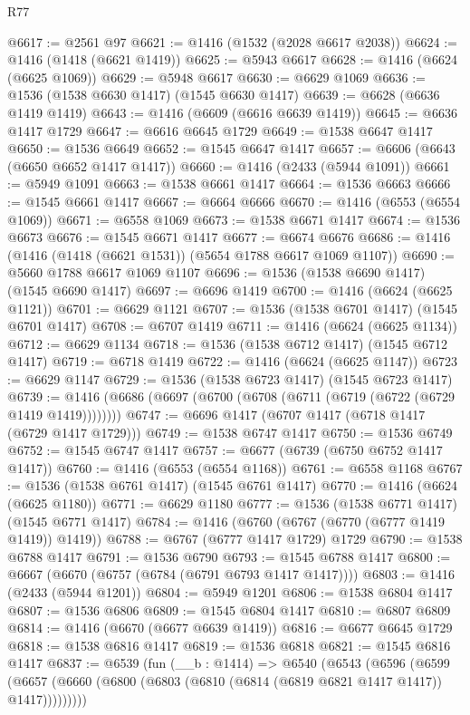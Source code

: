 \begin{lexlean}{R77}
\begin{coremodule}
{{@6617 := @2561 @97
@6621 := @1416 (@1532 (@2028 @6617 @2038))
@6624 := @1416 (@1418 (@6621 @1419))
@6625 := @5943 @6617
@6628 := @1416 (@6624 (@6625 @1069))
@6629 := @5948 @6617
@6630 := @6629 @1069
@6636 := @1536 (@1538 @6630 @1417) (@1545 @6630 @1417)
@6639 := @6628 (@6636 @1419 @1419)
@6643 := @1416 (@6609 (@6616 @6639 @1419))
@6645 := @6636 @1417 @1729
@6647 := @6616 @6645 @1729
@6649 := @1538 @6647 @1417
@6650 := @1536 @6649
@6652 := @1545 @6647 @1417
@6657 := @6606 (@6643 (@6650 @6652 @1417 @1417))
@6660 := @1416 (@2433 (@5944 @1091))
@6661 := @5949 @1091
@6663 := @1538 @6661 @1417
@6664 := @1536 @6663
@6666 := @1545 @6661 @1417
@6667 := @6664 @6666
@6670 := @1416 (@6553 (@6554 @1069))
@6671 := @6558 @1069
@6673 := @1538 @6671 @1417
@6674 := @1536 @6673
@6676 := @1545 @6671 @1417
@6677 := @6674 @6676
@6686 := @1416 (@1416 (@1418 (@6621 @1531)) (@5654 @1788 @6617 @1069 @1107))
@6690 := @5660 @1788 @6617 @1069 @1107
@6696 := @1536 (@1538 @6690 @1417) (@1545 @6690 @1417)
@6697 := @6696 @1419
@6700 := @1416 (@6624 (@6625 @1121))
@6701 := @6629 @1121
@6707 := @1536 (@1538 @6701 @1417) (@1545 @6701 @1417)
@6708 := @6707 @1419
@6711 := @1416 (@6624 (@6625 @1134))
@6712 := @6629 @1134
@6718 := @1536 (@1538 @6712 @1417) (@1545 @6712 @1417)
@6719 := @6718 @1419
@6722 := @1416 (@6624 (@6625 @1147))
@6723 := @6629 @1147
@6729 := @1536 (@1538 @6723 @1417) (@1545 @6723 @1417)
@6739 := @1416 (@6686 (@6697 (@6700 (@6708 (@6711 (@6719 (@6722 (@6729 @1419 @1419))))))))
@6747 := @6696 @1417 (@6707 @1417 (@6718 @1417 (@6729 @1417 @1729)))
@6749 := @1538 @6747 @1417
@6750 := @1536 @6749
@6752 := @1545 @6747 @1417
@6757 := @6677 (@6739 (@6750 @6752 @1417 @1417))
@6760 := @1416 (@6553 (@6554 @1168))
@6761 := @6558 @1168
@6767 := @1536 (@1538 @6761 @1417) (@1545 @6761 @1417)
@6770 := @1416 (@6624 (@6625 @1180))
@6771 := @6629 @1180
@6777 := @1536 (@1538 @6771 @1417) (@1545 @6771 @1417)
@6784 := @1416 (@6760 (@6767 (@6770 (@6777 @1419 @1419)) @1419))
@6788 := @6767 (@6777 @1417 @1729) @1729
@6790 := @1538 @6788 @1417
@6791 := @1536 @6790
@6793 := @1545 @6788 @1417
@6800 := @6667 (@6670 (@6757 (@6784 (@6791 @6793 @1417 @1417))))
@6803 := @1416 (@2433 (@5944 @1201))
@6804 := @5949 @1201
@6806 := @1538 @6804 @1417
@6807 := @1536 @6806
@6809 := @1545 @6804 @1417
@6810 := @6807 @6809
@6814 := @1416 (@6670 (@6677 @6639 @1419))
@6816 := @6677 @6645 @1729
@6818 := @1538 @6816 @1417
@6819 := @1536 @6818
@6821 := @1545 @6816 @1417
@6837 := @6539
    (fun (__b : @1414) =>
    @6540
      (@6543
        (@6596
          (@6599 (@6657 (@6660 (@6800 (@6803 (@6810 (@6814 (@6819 @6821 @1417 @1417)) @1417)))))))))
}}
\end{coremodule}
\end{lexlean}

